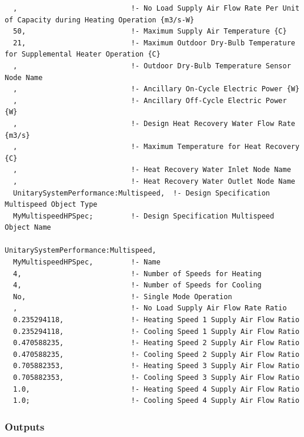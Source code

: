 \begin{lstlisting}
  ,                           !- No Load Supply Air Flow Rate Per Unit of Capacity during Heating Operation {m3/s-W}
  50,                         !- Maximum Supply Air Temperature {C}
  21,                         !- Maximum Outdoor Dry-Bulb Temperature for Supplemental Heater Operation {C}
  ,                           !- Outdoor Dry-Bulb Temperature Sensor Node Name
  ,                           !- Ancillary On-Cycle Electric Power {W}
  ,                           !- Ancillary Off-Cycle Electric Power {W}
  ,                           !- Design Heat Recovery Water Flow Rate {m3/s}
  ,                           !- Maximum Temperature for Heat Recovery {C}
  ,                           !- Heat Recovery Water Inlet Node Name
  ,                           !- Heat Recovery Water Outlet Node Name
  UnitarySystemPerformance:Multispeed,  !- Design Specification Multispeed Object Type
  MyMultispeedHPSpec;         !- Design Specification Multispeed Object Name

UnitarySystemPerformance:Multispeed,
  MyMultispeedHPSpec,         !- Name
  4,                          !- Number of Speeds for Heating
  4,                          !- Number of Speeds for Cooling
  No,                         !- Single Mode Operation
  ,                           !- No Load Supply Air Flow Rate Ratio
  0.235294118,                !- Heating Speed 1 Supply Air Flow Ratio
  0.235294118,                !- Cooling Speed 1 Supply Air Flow Ratio
  0.470588235,                !- Heating Speed 2 Supply Air Flow Ratio
  0.470588235,                !- Cooling Speed 2 Supply Air Flow Ratio
  0.705882353,                !- Heating Speed 3 Supply Air Flow Ratio
  0.705882353,                !- Cooling Speed 3 Supply Air Flow Ratio
  1.0,                        !- Heating Speed 4 Supply Air Flow Ratio
  1.0;                        !- Cooling Speed 4 Supply Air Flow Ratio
\end{lstlisting}

\subsubsection{Outputs}\label{outputs-038}

